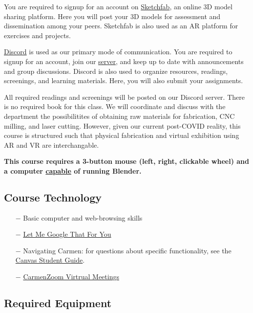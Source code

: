 \documentclass[12pt,letter,english]{report}
\providecommand{\tightlist}{%
      \setlength{\itemsep}{0pt}\setlength{\parskip}{0pt}%
}
\begin{document}
You are required to signup for an account on \href{http://sketchfab.com}{Sketchfab}, an online 3D model sharing platform. Here you will post your 3D models for assessment and dissemination among your peers. Sketchfab is also used as an AR platform for exercises and projects.

\href{http://discordapp.com/}{Discord} is used as our primary mode of communication. You are required to signup for an account, join our \href{https://discord.gg/urXaaaY}{server}, and keep up to date with announcements and group discussions. Discord is also used to organize resources, readings, screenings, and learning materials. Here, you will also submit your assignments.

All required readings and screenings will be posted on our Discord server. There is no required book for this class. We will coordinate and discuss with the department the possibilitites of obtaining raw materials for fabrication, CNC milling, and laser cutting. However, given our current post-COVID reality, this course is structured such that physical fabrication and virtual exhibition using AR and VR are interchangable.

\textbf{This course requires a 3-button mouse (left, right, clickable wheel) and a computer \href{https://www.blender.org/download/requirements/}{capable} of running Blender.}

\subsection{Course Technology}

\begin{itemize}
      \tightlist
      \item[$-$] Basic computer and web-browsing skills
      \item[$-$] \href{https://lmgtfy.com/}{Let Me Google That For You}
      \item[$-$] Navigating Carmen: for questions about specific functionality, see the \href{https://community.canvaslms.com/docs/DOC-10701}{Canvas Student Guide}.
      \item[$-$] \href{https://go.osu.edu/Bqdx}{CarmenZoom Virtrual Meetings}
\end{itemize}

\subsection{Required Equipment}
\end{document}
